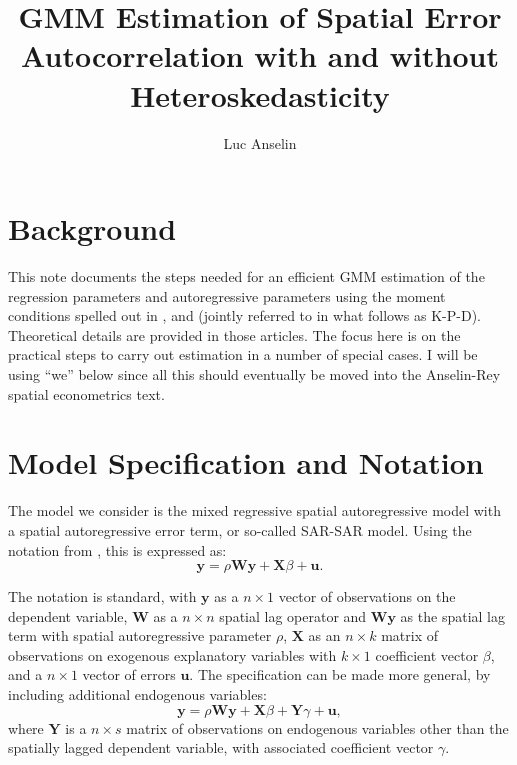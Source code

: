 \documentclass{article}
\title{GMM Estimation of Spatial Error Autocorrelation with and
without Heteroskedasticity}
\author{Luc Anselin}
\begin{document}
\maketitle
\section{Background}
This note documents the steps needed for an efficient GMM estimation of the
regression parameters and autoregressive parameters using the moment conditions
spelled out in \cite{KelejianPrucha:10}, \cite{Arraizetal:10} and \cite{Drukkeretal:10,Drukkeretal:11} (jointly referred to in what
follows as K-P-D). Theoretical details are
provided in those articles. The focus here is on the practical steps to carry out estimation
in a number of special cases. I will be using ``we'' below since all this should eventually
be moved into the Anselin-Rey spatial econometrics text.

\section{Model Specification and Notation}

The model we consider is the mixed regressive spatial autoregressive model with
a spatial autoregressive error term, or so-called SAR-SAR model. Using the notation from \cite{Anselin:88}, this
is expressed as:
\begin{equation*}
    \mathbf{y} = \rho \mathbf{Wy} + \mathbf{X} \beta + \mathbf{u}.
    \label{model1}
\end{equation*}

The notation is standard, with $\mathbf{y}$ as a $n \times 1$ vector of observations
on the dependent variable, $\mathbf{W}$ as a $n \times n$ spatial lag operator and
$\mathbf{Wy}$ as the spatial lag term with spatial autoregressive parameter
$\rho$, $\mathbf{X}$ as an $n \times k$ matrix of observations
on exogenous explanatory variables with $k \times 1$ coefficient vector $\beta$, and a
$n \times 1$ vector of errors $\mathbf{u}$. The specification can be made more general, by
including additional endogenous variables:
\begin{equation*}
    \mathbf{y} = \rho \mathbf{Wy} + \mathbf{X} \beta + \mathbf{Y} \gamma + \mathbf{u},
\end{equation*}
where 
$\mathbf{Y}$ is a $n \times s$ matrix of observations on endogenous variables
other than the spatially lagged dependent variable, with associated coefficient
vector $\gamma$.
\end{document}
